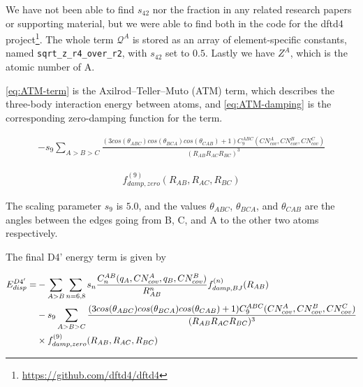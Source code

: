 We have not been able to find $s_{42}$ nor the fraction in any related research papers or supporting material, but we were able to find both in the code for the dftd4 project\footnote{\url{https://github.com/dftd4/dftd4}}. The whole term $\mathcal{Q}^A$ is stored as an array of element-specific constants, named \verb|sqrt_z_r4_over_r2|, with $s_{42}$ set to $0.5$. Lastly we have $Z^A$, which is the atomic number of A.

\autoref{eq:ATM-term} is the Axilrod–Teller–Muto (ATM) term, which describes the three-body interaction energy between atoms, and \autoref{eq:ATM-damping} is the corresponding zero-damping function for the term.

\begin{equation}
\begin{split}
        -s_9 \sum_{A>B>C} \frac{(3cos(\theta_{ABC})cos(\theta_{BCA})cos(\theta_{CAB})+1)C_9^{ABC}(CN_{cov}^A,CN_{cov}^B,CN_{cov}^C)}{(R_{AB} R_{AC} R_{BC})^3} \label{eq:ATM-term}
\end{split}
\end{equation}

\begin{equation}
\begin{split}
        f^{(9)}_{damp,zero}(R_{AB},R_{AC},R_{BC}) \label{eq:ATM-damping}
\end{split}
\end{equation}


The scaling parameter $s_9$ is $5.0$, and the values \(\theta_{ABC}\), \(\theta_{BCA}\), and \(\theta_{CAB}\) are the angles between the edges going from B, C, and A to the other two atoms respectively.






The final D4' energy term is given by


\begin{equation}
\begin{split}
  \E{disp}^{D4'} = &-\sum_{A>B} \sum_{n=6,8} s_n \frac{C_n^{AB} (q_A, CN^A_{cov}, q_B, CN^B_{cov})}{R^n_{AB}} f^{(n)}_{damp,BJ} (R_{AB}) \\
  &-s_9 \sum_{A>B>C} \frac{(3cos(\theta_{ABC})cos(\theta_{BCA})cos(\theta_{CAB})+1)C_9^{ABC}(CN_{cov}^A,CN_{cov}^B,CN_{cov}^C)}{(R_{AB} R_{AC} R_{BC})^3} \\
  &\times f^{(9)}_{damp,zero}(R_{AB},R_{AC},R_{BC})
\end{split}
\end{equation}


